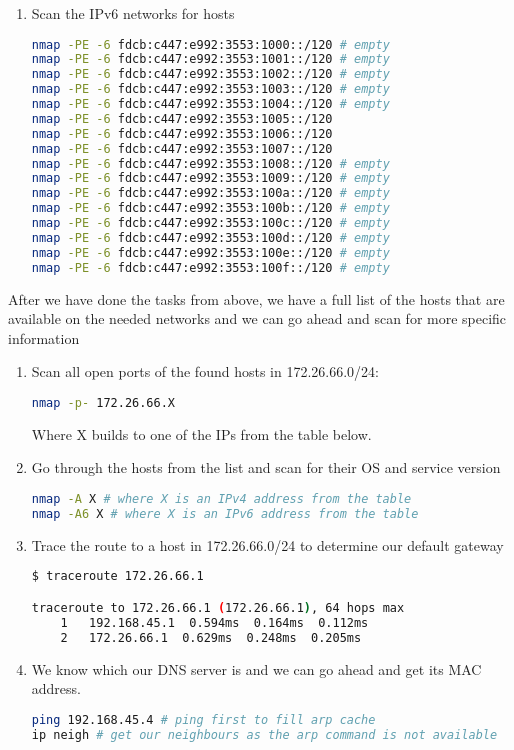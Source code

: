 \begin{enumerate}
    \item Scan the IPv6 networks for hosts
    \begin{lstlisting}[language=bash,numbers=none]
nmap -PE -6 fdcb:c447:e992:3553:1000::/120 # empty
nmap -PE -6 fdcb:c447:e992:3553:1001::/120 # empty
nmap -PE -6 fdcb:c447:e992:3553:1002::/120 # empty
nmap -PE -6 fdcb:c447:e992:3553:1003::/120 # empty
nmap -PE -6 fdcb:c447:e992:3553:1004::/120 # empty
nmap -PE -6 fdcb:c447:e992:3553:1005::/120
nmap -PE -6 fdcb:c447:e992:3553:1006::/120
nmap -PE -6 fdcb:c447:e992:3553:1007::/120
nmap -PE -6 fdcb:c447:e992:3553:1008::/120 # empty
nmap -PE -6 fdcb:c447:e992:3553:1009::/120 # empty
nmap -PE -6 fdcb:c447:e992:3553:100a::/120 # empty
nmap -PE -6 fdcb:c447:e992:3553:100b::/120 # empty
nmap -PE -6 fdcb:c447:e992:3553:100c::/120 # empty
nmap -PE -6 fdcb:c447:e992:3553:100d::/120 # empty
nmap -PE -6 fdcb:c447:e992:3553:100e::/120 # empty
nmap -PE -6 fdcb:c447:e992:3553:100f::/120 # empty
    \end{lstlisting}
\end{enumerate}

After we have done the tasks from above, we have a full list of the hosts that are available on the needed networks
and we can go ahead and scan for more specific information

\begin{enumerate}
    \item Scan all open ports of the found hosts in 172.26.66.0/24:
    \begin{lstlisting}[language=bash,numbers=none]
nmap -p- 172.26.66.X
    \end{lstlisting}
    Where X builds to one of the IPs from the table below.

    \item Go through the hosts from the list and scan for their OS and service version
    \begin{lstlisting}[language=bash,numbers=none]
nmap -A X # where X is an IPv4 address from the table
nmap -A6 X # where X is an IPv6 address from the table
    \end{lstlisting}

    \item Trace the route to a host in 172.26.66.0/24 to determine our default gateway
    \begin{lstlisting}[language=bash,numbers=none]
$ traceroute 172.26.66.1

traceroute to 172.26.66.1 (172.26.66.1), 64 hops max
    1   192.168.45.1  0.594ms  0.164ms  0.112ms
    2   172.26.66.1  0.629ms  0.248ms  0.205ms
    \end{lstlisting}

    \item We know which our DNS server is and we can go ahead and get its MAC address.
    \begin{lstlisting}[language=bash,numbers=none]
ping 192.168.45.4 # ping first to fill arp cache
ip neigh # get our neighbours as the arp command is not available
    \end{lstlisting}

\end{enumerate}

